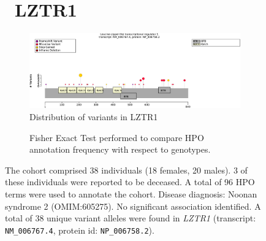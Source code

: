 \begin{figure}[htbp]
\section*{ LZTR1}
\centering
\begin{subfigure}[b]{0.95\textwidth}
\centering
\includegraphics[width=\textwidth]{ img/LZTR1_protein_diagram.pdf} 
\captionsetup{justification=raggedright,singlelinecheck=false}
\caption{Distribution of variants in LZTR1}
\end{subfigure}

\vspace{2em}

\begin{subfigure}[b]{0.95\textwidth}
\centering
{}
\captionsetup{justification=raggedright,singlelinecheck=false}
\caption{ Fisher Exact Test performed to compare HPO annotation frequency with respect to genotypes. }
\end{subfigure}

\vspace{2em}

\caption{ The cohort comprised 38 individuals (18 females, 20 males). 3 of these individuals were reported to be deceased. A total of 96 HPO terms were used to annotate the cohort. Disease diagnosis: Noonan syndrome 2 (OMIM:605275). No significant association identified. A total of 38 unique variant alleles were found in \textit{LZTR1} (transcript: \texttt{NM\_006767.4}, protein id: \texttt{NP\_006758.2}).}
\end{figure}
